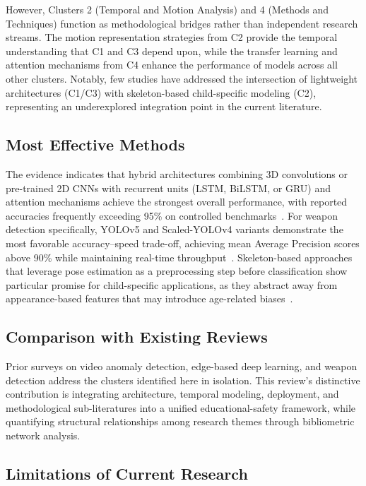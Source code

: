 \documentclass[conference]{IEEEtran}
\begin{document}
However, Clusters 2 (Temporal and Motion Analysis) and 4 (Methods and Techniques) function as methodological bridges rather than independent research streams. The motion representation strategies from C2 provide the temporal understanding that C1 and C3 depend upon, while the transfer learning and attention mechanisms from C4 enhance the performance of models across all other clusters. Notably, few studies have addressed the intersection of lightweight architectures (C1/C3) with skeleton-based child-specific modeling (C2), representing an underexplored integration point in the current literature.

\subsection{Most Effective Methods}

The evidence indicates that hybrid architectures combining 3D convolutions or pre-trained 2D CNNs with recurrent units (LSTM, BiLSTM, or GRU) and attention mechanisms achieve the strongest overall performance, with reported accuracies frequently exceeding 95\% on controlled benchmarks~\cite{b17,b18,b2}. For weapon detection specifically, YOLOv5 and Scaled-YOLOv4 variants demonstrate the most favorable accuracy--speed trade-off, achieving mean Average Precision scores above 90\% while maintaining real-time throughput~\cite{b19,b9}. Skeleton-based approaches that leverage pose estimation as a preprocessing step before classification show particular promise for child-specific applications, as they abstract away from appearance-based features that may introduce age-related biases~\cite{b16,b20}.

\subsection{Comparison with Existing Reviews}

Prior surveys on video anomaly detection, edge-based deep learning, and weapon detection address the clusters identified here in isolation. This review's distinctive contribution is integrating architecture, temporal modeling, deployment, and methodological sub-literatures into a unified educational-safety framework, while quantifying structural relationships among research themes through bibliometric network analysis.

\subsection{Limitations of Current Research}
\end{document}

